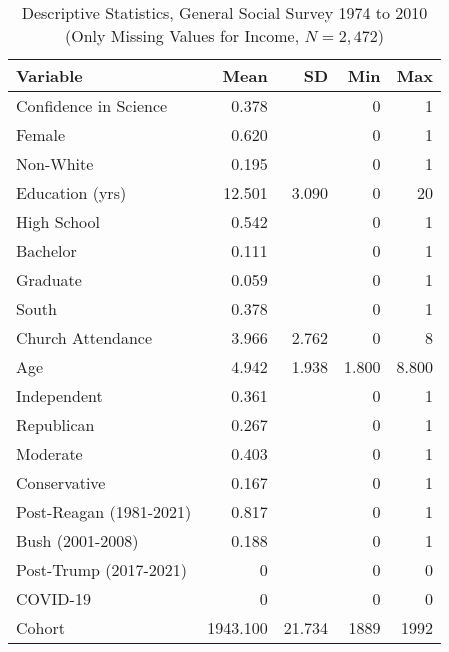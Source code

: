 \begin{table}[ht]
\centering
\caption{Descriptive Statistics, General Social Survey 1974 to 2010 (Only Missing Values for Income, $N=2,472$)} 
\begin{tabularx}{\textwidth}{Xrrrr}
  \toprule
Variable & Mean & SD & Min & Max \\ 
  \midrule
Confidence in Science & 0.378 &  & 0 & 1 \\ 
  Female & 0.620 &  & 0 & 1 \\ 
  Non-White & 0.195 &  & 0 & 1 \\ 
  Education (yrs) & 12.501 & 3.090 & 0 & 20 \\ 
  High School & 0.542 &  & 0 & 1 \\ 
  Bachelor & 0.111 &  & 0 & 1 \\ 
  Graduate & 0.059 &  & 0 & 1 \\ 
  South & 0.378 &  & 0 & 1 \\ 
  Church Attendance & 3.966 & 2.762 & 0 & 8 \\ 
  Age & 4.942 & 1.938 & 1.800 & 8.800 \\ 
  Independent & 0.361 &  & 0 & 1 \\ 
  Republican & 0.267 &  & 0 & 1 \\ 
  Moderate & 0.403 &  & 0 & 1 \\ 
  Conservative & 0.167 &  & 0 & 1 \\ 
  Post-Reagan (1981-2021) & 0.817 &  & 0 & 1 \\ 
  Bush (2001-2008) & 0.188 &  & 0 & 1 \\ 
  Post-Trump (2017-2021) & 0 &  & 0 & 0 \\ 
  COVID-19 & 0 &  & 0 & 0 \\ 
  Cohort & 1943.100 & 21.734 & 1889 & 1992 \\ 
   \bottomrule
\end{tabularx}
\end{table}
